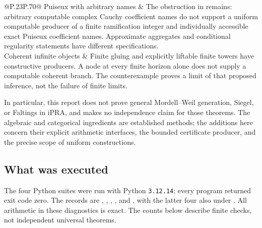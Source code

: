 \begin{longtable}{@{}P{.23\linewidth}P{.70\linewidth}@{}}
Puiseux with arbitrary names & The obstruction in \cite{repo-puiseux} remains:
arbitrary computable complex Cauchy coefficient names do not support a
uniform computable producer of a finite ramification integer and individually
accessible exact Puiseux coefficient names. Approximate aggregates and
conditional regularity statements have different specifications.\\
Coherent infinite objects & Finite gluing and explicitly liftable finite
towers have constructive producers. A node at every finite horizon alone
does not supply a computable coherent branch. The counterexample proves a
limit of that proposed inference, not the failure of finite limits.\\
\bottomrule
\end{longtable}

In particular, this report does not prove general Mordell--Weil generation,
Siegel, or Faltings in iPRA, and makes no independence claim for those
theorems. The algebraic and categorical ingredients are established methods;
the additions here concern their explicit arithmetic interfaces, the bounded
certificate producer, and the precise scope of uniform constructions.

\subsection{What was executed}

The four Python suites were run with Python \texttt{3.12.14}; every program
returned exit code zero. The records are
, ,
, , and
, with the latter four also under
. All arithmetic in these diagnostics is exact. The counts
below describe finite checks, not independent universal theorems.

